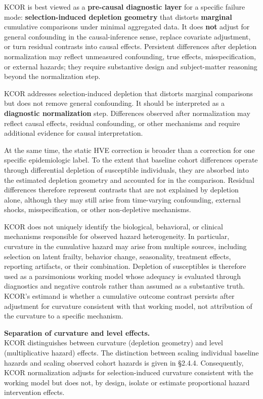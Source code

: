 \documentclass[
]{article}
\begin{document}
KCOR is best viewed as a \textbf{pre-causal diagnostic layer} for a specific failure mode: \textbf{selection-induced depletion geometry} that distorts \textbf{marginal} cumulative comparisons under minimal aggregated data. It does \textbf{not} adjust for general confounding in the causal-inference sense, replace covariate adjustment, or turn residual contrasts into causal effects. Persistent differences after depletion normalization may reflect unmeasured confounding, true effects, misspecification, or external hazards; they require substantive design and subject-matter reasoning beyond the normalization step.

KCOR addresses selection-induced depletion that distorts marginal comparisons but does not remove general confounding. It should be interpreted as a \textbf{diagnostic normalization} step. Differences observed after normalization may reflect causal effects, residual confounding, or other mechanisms and require additional evidence for causal interpretation.

At the same time, the static HVE correction is broader than a correction for one specific epidemiologic label. To the extent that baseline cohort differences operate through differential depletion of susceptible individuals, they are absorbed into the estimated depletion geometry and accounted for in the comparison. Residual differences therefore represent contrasts that are not explained by depletion alone, although they may still arise from time-varying confounding, external shocks, misspecification, or other non-depletive mechanisms.

KCOR does not uniquely identify the biological, behavioral, or clinical mechanisms responsible for observed hazard heterogeneity. In particular, curvature in the cumulative hazard may arise from multiple sources, including selection on latent frailty, behavior change, seasonality, treatment effects, reporting artifacts, or their combination. Depletion of susceptibles is therefore used as a parsimonious working model whose adequacy is evaluated through diagnostics and negative controls rather than assumed as a substantive truth. KCOR's estimand is whether a cumulative outcome contrast persists after adjustment for curvature consistent with that working model, not attribution of the curvature to a specific mechanism.

\textbf{Separation of curvature and level effects.}\\
KCOR distinguishes between curvature (depletion geometry) and level (multiplicative hazard) effects. The distinction between scaling individual baseline hazards and scaling observed cohort hazards is given in §2.4.4. Consequently, KCOR normalization adjusts for selection-induced curvature consistent with the working model but does not, by design, isolate or estimate proportional hazard intervention effects.
\end{document}
